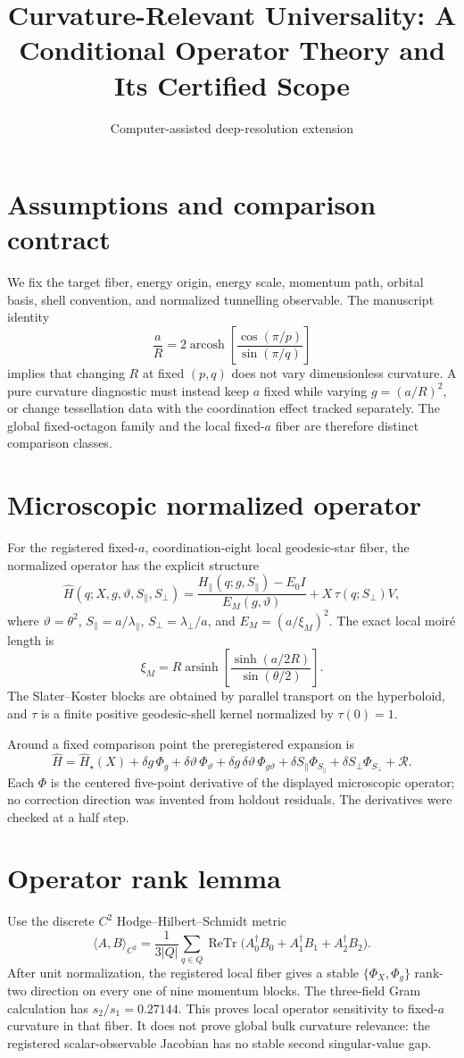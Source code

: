 \documentclass[11pt]{article}
\title{Curvature-Relevant Universality: A Conditional Operator Theory and Its Certified Scope}
\author{Computer-assisted deep-resolution extension}
\date{}
\begin{document}
\maketitle

\section{Assumptions and comparison contract}
We fix the target fiber, energy origin, energy scale, momentum path, orbital
basis, shell convention, and normalized tunnelling observable.  The manuscript
identity
\[
  \frac{a}{R}=2\operatorname{arcosh}\!\left[
  \frac{\cos(\pi/p)}{\sin(\pi/q)}\right]
\]
implies that changing $R$ at fixed $(p,q)$ does not vary dimensionless
curvature.  A pure curvature diagnostic must instead keep $a$ fixed while
varying $g=(a/R)^2$, or change tessellation data with the coordination effect
tracked separately.  The global fixed-octagon family and the local fixed-$a$
fiber are therefore distinct comparison classes.

\section{Microscopic normalized operator}
For the registered fixed-$a$, coordination-eight local geodesic-star fiber,
the normalized operator has the explicit structure
\[
 \widehat H(q;X,g,\vartheta,S_\parallel,S_\perp)
 =\frac{H_\parallel(q;g,S_\parallel)-E_0 I}{E_M(g,\vartheta)}
 +X\,\tau(q;S_\perp) V,
\]
where $\vartheta=\theta^2$, $S_\parallel=a/\lambda_\parallel$,
$S_\perp=\lambda_\perp/a$, and $E_M=(a/\xi_M)^2$.  The exact local moir\'e
length is
\[
 \xi_M=R\operatorname{arsinh}\!\left[
 \frac{\sinh(a/2R)}{\sin(\theta/2)}\right].
\]
The Slater--Koster blocks are obtained by parallel transport on the hyperboloid,
and $\tau$ is a finite positive geodesic-shell kernel normalized by $\tau(0)=1$.

Around a fixed comparison point the preregistered expansion is
\[
 \widehat H=\widehat H_\star(X)+\delta g\,\Phi_g
 +\delta\vartheta\,\Phi_\vartheta
 +\delta g\,\delta\vartheta\,\Phi_{g\vartheta}
 +\delta S_\parallel\Phi_{S_\parallel}
 +\delta S_\perp\Phi_{S_\perp}+\mathcal R.
\]
Each $\Phi$ is the centered five-point derivative of the displayed
microscopic operator; no correction direction was invented from holdout
residuals.  The derivatives were checked at a half step.

\section{Operator rank lemma}
Use the discrete $C^2$ Hodge--Hilbert--Schmidt metric
\[
 \langle A,B\rangle_{C^2}=\frac1{3|Q|}\sum_{q\in Q}
 \operatorname{ReTr}\bigl(A_0^\dagger B_0+A_1^\dagger B_1+A_2^\dagger B_2\bigr).
\]
After unit normalization, the registered local fiber gives a stable
$\{\Phi_X,\Phi_g\}$ rank-two direction on every one of nine momentum blocks.
The three-field Gram calculation has $s_2/s_1=0.27144$.  This proves local
operator sensitivity to fixed-$a$ curvature in that fiber.  It does not prove
global bulk curvature relevance: the registered scalar-observable Jacobian has
no stable second singular-value gap.
\end{document}
